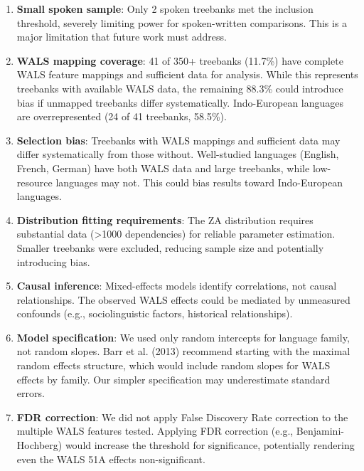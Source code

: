 \documentclass[11pt,letterpaper]{article}
\begin{document}
\begin{enumerate}
  \item \textbf{Small spoken sample}: Only 2 spoken treebanks met the inclusion threshold, severely limiting power for spoken-written comparisons. This is a major limitation that future work must address.

  \item \textbf{WALS mapping coverage}: 41 of 350+ treebanks (11.7\%) have complete WALS feature mappings and sufficient data for analysis. While this represents treebanks with available WALS data, the remaining 88.3\% could introduce bias if unmapped treebanks differ systematically. Indo-European languages are overrepresented (24 of 41 treebanks, 58.5\%).

  \item \textbf{Selection bias}: Treebanks with WALS mappings and sufficient data may differ systematically from those without. Well-studied languages (English, French, German) have both WALS data and large treebanks, while low-resource languages may not. This could bias results toward Indo-European languages.

  \item \textbf{Distribution fitting requirements}: The ZA distribution requires substantial data (>1000 dependencies) for reliable parameter estimation. Smaller treebanks were excluded, reducing sample size and potentially introducing bias.

  \item \textbf{Causal inference}: Mixed-effects models identify correlations, not causal relationships. The observed WALS effects could be mediated by unmeasured confounds (e.g., sociolinguistic factors, historical relationships).

  \item \textbf{Model specification}: We used only random intercepts for language family, not random slopes. Barr et al. (2013) recommend starting with the maximal random effects structure, which would include random slopes for WALS effects by family. Our simpler specification may underestimate standard errors.

  \item \textbf{FDR correction}: We did not apply False Discovery Rate correction to the multiple WALS features tested. Applying FDR correction (e.g., Benjamini-Hochberg) would increase the threshold for significance, potentially rendering even the WALS 51A effects non-significant.
\end{enumerate}
\end{document}
